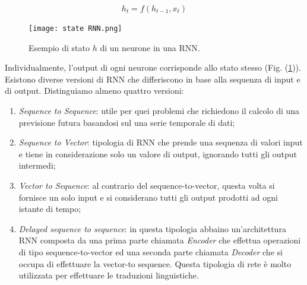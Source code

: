 \begin{equation}
    h_t = f(h_{t-1}, x_t)
\end{equation}
\begin{figure}
    \centering
    \texttt{[image: state RNN.png]}
    \centering
    \caption{Esempio di stato $h$ di un neurone in una RNN.}
    \label{state-neuron-rnn}
\end{figure}
Individualmente, l'output di ogni neurone corrisponde allo stato stesso 
(Fig. (\ref{state-neuron-rnn})). Esistono diverse versioni di RNN che differiscono 
in base alla sequenza di input e di output. Distinguiamo almeno quattro versioni:
\begin{enumerate}
    \item \emph{Sequence to Sequence}: utile per quei problemi che richiedono il calcolo 
    di una previsione futura basandosi sul una serie temporale di dati;
    \item \emph{Sequence to Vector}: tipologia di RNN che prende una sequenza di 
    valori input e tiene in considerazione solo un valore di output, ignorando 
    tutti gli output intermedi;
    \item \emph{Vector to Sequence}: al contrario del sequence-to-vector, questa volta 
    si fornisce un solo input e si considerano tutti gli output prodotti ad 
    ogni istante di tempo;
    \item \emph{Delayed sequence to sequence}: in questa tipologia abbaino un'architettura 
    RNN composta da una prima parte chiamata \emph{Encoder} che 
    effettua operazioni di tipo sequence-to-vector ed una seconda parte 
    chiamata \emph{Decoder} che si occupa di effettuare la vector-to sequence. 
    Questa tipologia di rete è molto utilizzata per effettuare le 
    traduzioni linguistiche. 
\end{enumerate}

